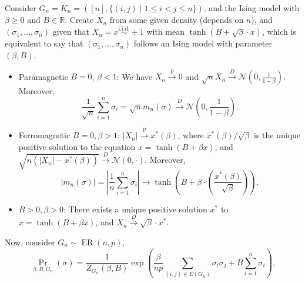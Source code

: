 Consider \(G_n = K_n = ([n], \{(i, j) \mid 1 \leq i < j \leq n \} )\), and the Ising model with \(\beta \geq 0\) and \(B \in \mathbb{R} \). Create \(X_n\) from some given density (depends on \(n\)), and \((\sigma _1, \dots , \sigma _n)\) given that \(X_n = x \overset{\text{i.i.d.} }{\sim } \pm 1\) with mean \(\tanh(B + \sqrt{\beta } \cdot x )\), which is equivalent to say that \((\sigma _1, \dots , \sigma _n)\) follows an Ising model with parameter \((\beta , B)\).

\begin{prev}
	\begin{itemize}
		\item Paramagnetic \(B = 0\), \(\beta < 1\): We have \(X_n \overset{p}{\to} 0\) and \(\sqrt{n} X_n \overset{D}{\to} \mathcal{N} (0, \frac{1}{1 - \beta })\). Moreover,
		      \[
			      \frac{1}{\sqrt{n} } \sum_{i=1}^{n} \sigma _i
			      = \sqrt{n} m_n(\sigma )
			      \overset{D}{\to} \mathcal{N} \left( 0, \frac{1}{1 - \beta } \right).
		      \]
		\item Ferromagnetic \(B = 0, \beta > 1\): \(\lvert X_n \rvert \overset{p}{\to} x^{\ast} (\beta )\), where \(x^{\ast} (\beta ) / \sqrt{\beta } \) is the unique positive solution to the equation \(x = \tanh(B + \beta x)\), and \(\sqrt{n(\lvert X_n \rvert - x^{\ast} (\beta ))} \overset{D}{\to} \mathcal{N} (0, \cdot )\). Moreover,
		      \[
			      \lvert m_n(\sigma ) \rvert
			      = \left\lvert \frac{1}{n}\sum_{i=1}^{n} \sigma _i \right\rvert
			      \to \tanh(B + \beta \cdot \left( \frac{x^{\ast} (\beta )}{\sqrt{\beta } } \right) ).
		      \]
		\item \(B > 0, \beta > 0\): There exists a unique positive solution \(x^{\ast} \) to \(x = \tanh(B + \beta x)\), and \(X_n \overset{D}{\to} \sqrt{\beta } \cdot x^{\ast} \).
	\end{itemize}
\end{prev}

Now, consider \(G_n \sim \operatorname{ER}(n, p) \),
\[
	\Pr_{\beta , B, G_n}\left(\sigma \right)
	= \frac{1}{Z_{G_n}(\beta , B)} \exp (\frac{\beta }{np} \sum_{(i, j) \in E(G_n)} \sigma _i \sigma _j + B \sum_{i=1}^{n} \sigma _i).
\]

